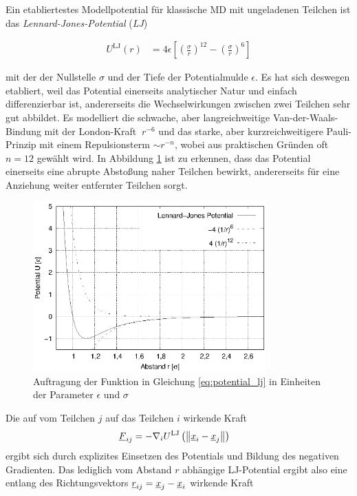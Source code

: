 		Ein etabliertestes Modellpotential für klassische MD mit ungeladenen Teilchen ist das
		\emph{Lennard-Jones-Potential} (\emph{LJ})

		\begin{align}
			U^\text{LJ}(r) &= 4\epsilon \left[
				\left(\frac{\sigma}{r}\right)^{12}
				-
				\left(\frac{\sigma}{r}\right)^{6}
			\right]
			\label{eq:potential_lj}
		\end{align}

		mit der der Nullstelle $\sigma$ und der Tiefe der Potentialmulde $\epsilon$. Es hat sich
		deswegen etabliert, weil das Potential einerseits analytischer Natur und einfach
		differenzierbar ist, andererseits die Wechselwirkungen zwischen zwei Teilchen sehr gut
		abbildet. Es modelliert die schwache, aber langreichweitige Van-der-Waals-Bindung mit der
		London-Kraft $~ r^{-6}$ und das starke, aber kurzreichweitigere Pauli-Prinzip mit einem
		Repulsionsterm $\sim r^{-n}$, wobei aus praktischen Gründen oft $n=12$ gewählt wird. In
		Abbildung \ref{fig:potential_lj} ist zu erkennen, dass das Potential einerseits eine
		abrupte Abstoßung naher Teilchen bewirkt, andererseits für eine Anziehung weiter
		entfernter Teilchen sorgt.

		\begin{figure}[!ht]
			\centering
			\includegraphics[width=0.8\textwidth]{chapter/main/plt/lennard_jones.eps}
			\caption{Auftragung der Funktion in Gleichung \eqref{eq:potential_lj} in Einheiten
			der Parameter $\epsilon$ und $\sigma$}
			\label{fig:potential_lj}
		\end{figure}

		Die auf vom Teilchen $j$ auf das Teilchen $i$ wirkende Kraft
		\begin{align}
			\underline{F}_{ij} &= -\nabla_i U^\text{LJ}\left(
				\left\|\underline{x}_i - \underline{x}_j\right\|
			\right)
		\end{align}
		ergibt sich durch explizites Einsetzen des Potentials und Bildung des negativen Gradienten.
		Das lediglich vom Abstand $r$ abhängige LJ-Potential ergibt also eine entlang des
		Richtungsvektors $\underline{r}_{ij} = \underline{x}_j - \underline{x}_i$ wirkende Kraft


